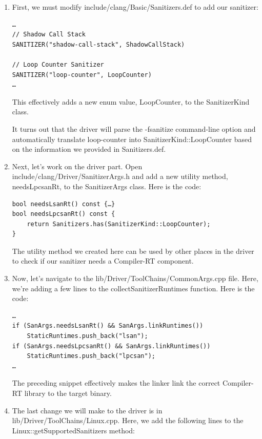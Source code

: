 \begin{enumerate}
\item First, we must modify include/clang/Basic/Sanitizers.def to add our sanitizer:

\begin{lstlisting}[style=styleCXX]
…
// Shadow Call Stack
SANITIZER("shadow-call-stack", ShadowCallStack)

// Loop Counter Sanitizer
SANITIZER("loop-counter", LoopCounter)
…
\end{lstlisting}

This effectively adds a new enum value, LoopCounter, to the SanitizerKind class.

It turns out that the driver will parse the -fsanitize command-line option and automatically translate loop-counter into SanitizerKind::LoopCounter based on the information we provided in Sanitizers.def.

\item Next, let's work on the driver part. Open include/clang/Driver/SanitizerArgs.h and add a new utility method, needsLpcsanRt, to the SanitizerArgs class. Here is the code:

\begin{lstlisting}[style=styleCXX]
bool needsLsanRt() const {…}
bool needsLpcsanRt() const {
	return Sanitizers.has(SanitizerKind::LoopCounter);
}
\end{lstlisting}

The utility method we created here can be used by other places in the driver to check if our sanitizer needs a Compiler-RT component.

\item Now, let's navigate to the lib/Driver/ToolChains/CommonArgs.cpp file. Here, we're adding a few lines to the collectSanitizerRuntimes function. Here is the code:

\begin{lstlisting}[style=styleCXX]
…
if (SanArgs.needsLsanRt() && SanArgs.linkRuntimes())
	StaticRuntimes.push_back("lsan");
if (SanArgs.needsLpcsanRt() && SanArgs.linkRuntimes())
	StaticRuntimes.push_back("lpcsan");
…
\end{lstlisting}

The preceding snippet effectively makes the linker link the correct Compiler-RT library to the target binary.

\item The last change we will make to the driver is in lib/Driver/ToolChains/Linux.cpp. Here, we add the following lines to the Linux::getSupportedSanitizers method:


\end{enumerate}
